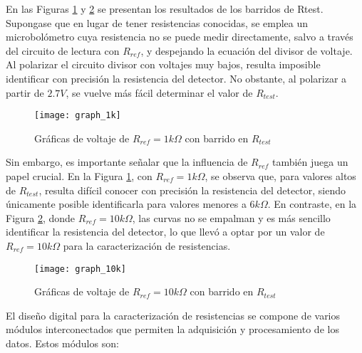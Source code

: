 En las Figuras \ref{fig:graph_1k} y \ref{fig:graph_10k} se presentan los resultados de los barridos de Rtest. Supongase que en lugar de tener resistencias conocidas, se emplea un microbolómetro cuya resistencia no se puede medir directamente, salvo a través del circuito de lectura con $R_{ref}$, y despejando la ecuación del divisor de voltaje. Al polarizar el circuito divisor con voltajes muy bajos, resulta imposible identificar con precisión la resistencia del detector. No obstante, al polarizar a partir de $2.7V$, se vuelve más fácil determinar el valor de $R_{test}$.

            \begin{figure}[hbtp]
                \centering
                \texttt{[image: graph\_1k]}
                \caption{Gráficas de voltaje de $R_{ref} = 1k\Omega$ con barrido en $R_{test}$}
                \label{fig:graph_1k}
            \end{figure}
            
 Sin embargo, es importante señalar que la influencia de $R_{ref}$ también juega un papel crucial. En la Figura \ref{fig:graph_1k}, con $R_{ref} = 1k\Omega$, se observa que, para valores altos de $R_{test}$, resulta difícil conocer con precisión la resistencia del detector, siendo únicamente posible identificarla para valores menores a $6k\Omega$. En contraste, en la Figura \ref{fig:graph_10k}, donde $R_{ref} = 10k\Omega$, las curvas no se empalman y es más sencillo identificar la resistencia del detector, lo que llevó a optar por un valor de $R_{ref} = 10k\Omega$ para la caracterización de resistencias.
 
            \begin{figure}[hbtp]
                \centering
                \texttt{[image: graph\_10k]}
                \caption{Gráficas de voltaje de $R_{ref} = 10k\Omega$ con barrido en $R_{test}$}
                \label{fig:graph_10k}
            \end{figure}

\newpage
El diseño digital para la caracterización de resistencias se compone de varios módulos interconectados que permiten la adquisición y procesamiento de los datos.
Estos módulos son:


